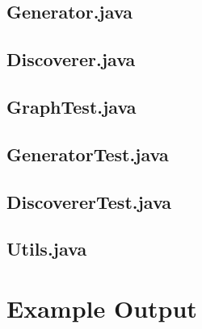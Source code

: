 \documentclass[12pt, titlepage, a4paper, twoside]{article}
\begin{document}
\subsection*{Generator.java}

\newpage

\subsection*{Discoverer.java}

\newpage

\subsection*{GraphTest.java}

\newpage

\subsection*{GeneratorTest.java}

\newpage

\subsection*{DiscovererTest.java}

\newpage

\subsection*{Utils.java}

\newpage

\section*{Example Output}

\end{document}
